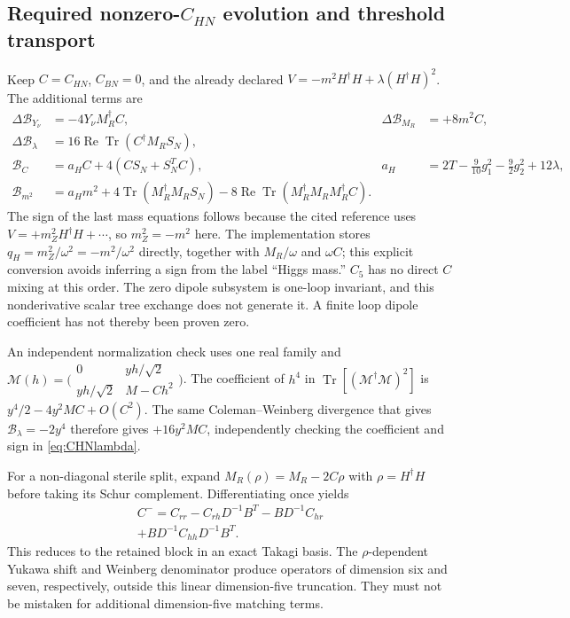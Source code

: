 \documentclass[11pt]{article}
\newcommand{\tr}{\operatorname{Tr}}
\newcommand{\B}{\mathcal B}
\begin{document}
\subsection{Required nonzero-$C_{HN}$ evolution and threshold transport}
Keep $C=C_{HN}$, $C_{BN}=0$, and the already declared
$V=-m^2H^\dagger H+\lambda(H^\dagger H)^2$. The additional terms are
\begin{align}
 \Delta\B_{Y_\nu}&=-4Y_\nu M_R^\dagger C,&
 \Delta\B_{M_R}&=+8m^2C,\\
 \Delta\B_\lambda&=16\operatorname{Re}\tr(C^\dagger M_RS_N),\label{eq:CHNlambda}\\
 \B_C&=a_H C+4(CS_N+S_N^TC),&
 a_H&=2T-\tfrac9{10}g_1^2-\tfrac92g_2^2+12\lambda,\\
 \B_{m^2}&=a_Hm^2+4\tr(M_R^\dagger M_RS_N)
 -8\operatorname{Re}\tr(M_R^\dagger M_RM_R^\dagger C).
 \label{eq:CHNflow}
\end{align}
The sign of the last mass equations follows because the cited reference
uses $V=+m_Z^2H^\dagger H+\cdots$, so $m_Z^2=-m^2$ here.
The implementation stores $q_H=m_Z^2/\omega^2=-m^2/\omega^2$
directly, together with $M_R/\omega$ and $\omega C$; this explicit
conversion avoids inferring a sign from the label ``Higgs mass.''
$C_5$ has no direct $C$ mixing at this order. The zero dipole
subsystem is one-loop invariant, and this nonderivative scalar tree
exchange does not generate it. A finite loop dipole coefficient has
not thereby been proven zero.

An independent normalization check uses one real family and
$\mathcal M(h)=\bigl(\begin{smallmatrix}0&yh/\sqrt2\\
yh/\sqrt2&M-Ch^2\end{smallmatrix}\bigr)$.
The coefficient of $h^4$ in $\tr[(\mathcal M^\dagger\mathcal M)^2]$
is $y^4/2-4y^2MC+O(C^2)$. The same Coleman--Weinberg divergence
that gives $\B_\lambda=-2y^4$ therefore gives $+16y^2MC$,
independently checking the coefficient and sign in \eqref{eq:CHNlambda}.

For a non-diagonal sterile split, expand
$M_R(\rho)=M_R-2C\rho$ with $\rho=H^\dagger H$ before taking its
Schur complement. Differentiating once yields
\begin{multline}
 C^-=C_{rr}-C_{rh}D^{-1}B^T-BD^{-1}C_{hr}\\
 +BD^{-1}C_{hh}D^{-1}B^T. \label{eq:CHNSchur}
\end{multline}
This reduces to the retained block in an exact Takagi basis. The
$\rho$-dependent Yukawa shift and Weinberg denominator produce operators
of dimension six and seven, respectively, outside this linear
dimension-five truncation. They must not be mistaken for additional
dimension-five matching terms.
\end{document}
